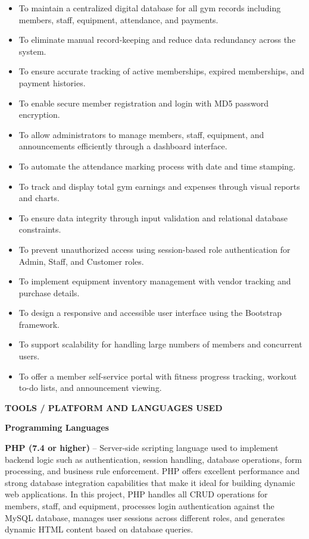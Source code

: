 \documentclass[12pt,a4paper]{report}
\begin{document}
\begin{itemize}
\item To maintain a centralized digital database for all gym records including members, staff, equipment, attendance, and payments.
\item To eliminate manual record-keeping and reduce data redundancy across the system.
\item To ensure accurate tracking of active memberships, expired memberships, and payment histories.
\item To enable secure member registration and login with MD5 password encryption.
\item To allow administrators to manage members, staff, equipment, and announcements efficiently through a dashboard interface.
\item To automate the attendance marking process with date and time stamping.
\item To track and display total gym earnings and expenses through visual reports and charts.
\item To ensure data integrity through input validation and relational database constraints.
\item To prevent unauthorized access using session-based role authentication for Admin, Staff, and Customer roles.
\item To implement equipment inventory management with vendor tracking and purchase details.
\item To design a responsive and accessible user interface using the Bootstrap framework.
\item To support scalability for handling large numbers of members and concurrent users.
\item To offer a member self-service portal with fitness progress tracking, workout to-do lists, and announcement viewing.
\end{itemize}

\newpage
\vspace*{\fill}
\begin{center}
{\LARGE \textbf{TOOLS / PLATFORM AND LANGUAGES USED}}
\end{center}
\vspace*{\fill}

\newpage
\textbf{Programming Languages}

\textbf{PHP (7.4 or higher)} -- Server-side scripting language used to implement backend logic such as authentication, session handling, database operations, form processing, and business rule enforcement. PHP offers excellent performance and strong database integration capabilities that make it ideal for building dynamic web applications. In this project, PHP handles all CRUD operations for members, staff, and equipment, processes login authentication against the MySQL database, manages user sessions across different roles, and generates dynamic HTML content based on database queries.
\end{document}
